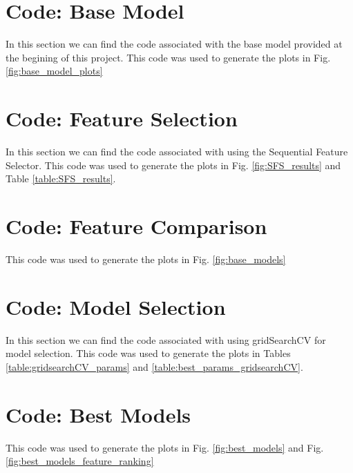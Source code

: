 \documentclass[]{article}
\begin{document}
\appendix

\clearpage
\section{Code: Base Model}

In this section we can find the code associated with the base model provided at the begining of this project. This code was used to generate the plots in Fig. \ref{fig:base_model_plots}



\section{Code: Feature Selection}

In this section we can find the code associated with using the Sequential Feature Selector. This code was used to generate the plots in Fig. \ref{fig:SFS_results} and Table \ref{table:SFS_results}.



\section{Code: Feature Comparison}

This code was used to generate the plots in Fig. \ref{fig:base_models}



\section{Code: Model Selection}

In this section we can find the code associated with using gridSearchCV for model selection. This code was used to generate the plots in Tables \ref{table:gridsearchCV_params} and \ref{table:best_params_gridsearchCV}.



\section{Code: Best Models}
This code was used to generate the plots in Fig. \ref{fig:best_models} and Fig. \ref{fig:best_models_feature_ranking}


\end{document}
